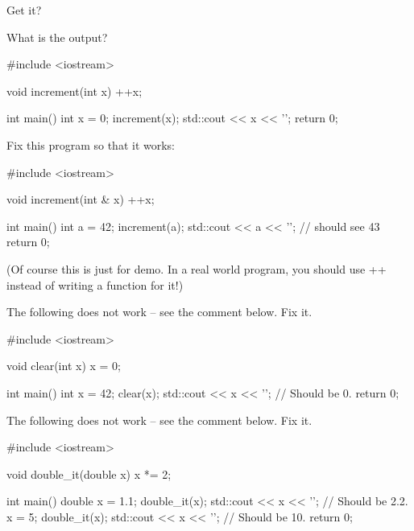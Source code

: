 Get it?

\begin{ex}
What is the output?

\begin{consolethree}[escapeinside=||]
#include <iostream>

void increment(int x)
{
    ++x;
}

int main()
{
    int x = 0;
    increment(x);
    std::cout << x << '\n';
    return 0;
}
\end{consolethree}
\end{ex}

\begin{ex}
Fix this program so that it works:

\begin{consolethree}[escapeinside=||]
#include <iostream>

void increment(int & x)
{
    ++x;
}

int main()
{
    int a = 42;
    increment(a);
    std::cout << a << '\n'; // should see 43
    return 0;
}
\end{consolethree}

(Of course this is just for demo. In a real world program, you should use ++ instead of writing a function for it!)
\end{ex}

\begin{ex}
The following does not work -- see the comment below. Fix it.

\begin{consolethree}[escapeinside=||]
#include <iostream>

void clear(int x)
{
    x = 0;
}

int main()
{
    int x = 42;
    clear(x);
    std::cout << x << '\n'; // Should be 0.
    return 0;
}
\end{consolethree}
\end{ex}

\begin{ex}
The following does not work -- see the comment below. Fix it.

\begin{consolethree}[escapeinside=||]
#include <iostream>

void double_it(double x)
{
    x *= 2;
}

int main()
{
    double x = 1.1;
    double_it(x);
    std::cout << x << '\n'; // Should be 2.2.
    x = 5;
    double_it(x);
    std::cout << x << '\n'; // Should be 10.
    return 0;
}
\end{consolethree}
\end{ex}

